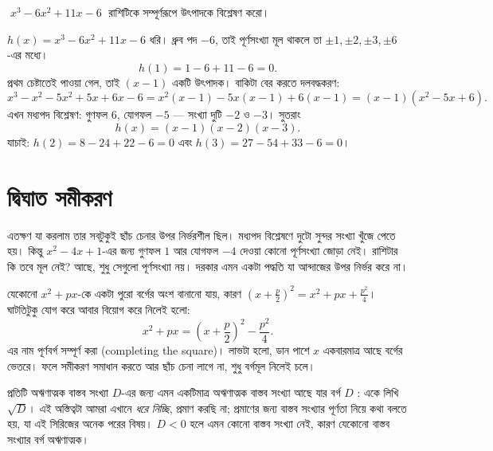 \documentclass[11pt]{article}
\begin{document}
 $\;x^{3} - 6x^{2} + 11x - 6\;$ রাশিটিকে সম্পূর্ণরূপে উৎপাদকে বিশ্লেষণ
করো।

\begin{sol}
$h(x) = x^{3} - 6x^{2} + 11x - 6$ ধরি। ধ্রুব পদ $-6$, তাই পূর্ণসংখ্যা মূল থাকলে
তা $\pm 1, \pm 2, \pm 3, \pm 6$-এর মধ্যে।
\[
  h(1) = 1 - 6 + 11 - 6 = 0 .
\]
প্রথম চেষ্টাতেই পাওয়া গেল, তাই $(x - 1)$ একটি উৎপাদক। বাকিটা বের করতে
দলবদ্ধকরণ:
\[
  x^{3} - x^{2} - 5x^{2} + 5x + 6x - 6
  = x^{2}(x-1) - 5x(x-1) + 6(x-1)
  = (x-1)(x^{2} - 5x + 6).
\]
এখন মধ্যপদ বিশ্লেষণ: গুণফল $6$, যোগফল $-5$ --- সংখ্যা দুটি $-2$ ও $-3$। সুতরাং
\[
  h(x) = (x - 1)(x - 2)(x - 3).
\]
যাচাই: $h(2) = 8 - 24 + 22 - 6 = 0$ এবং $h(3) = 27 - 54 + 33 - 6 = 0$।
\end{sol}

\section{দ্বিঘাত সমীকরণ}

\noindent
এতক্ষণ যা করলাম তার সবটুকুই ছাঁচ চেনার উপর নির্ভরশীল ছিল। মধ্যপদ বিশ্লেষণে
দুটো সুন্দর সংখ্যা খুঁজে পেতে হয়। কিন্তু $x^{2} - 4x + 1$-এর জন্য গুণফল $1$ আর
যোগফল $-4$ দেওয়া কোনো পূর্ণসংখ্যা জোড়া নেই। রাশিটার কি তবে মূল নেই? আছে, শুধু
সেগুলো পূর্ণসংখ্যা নয়। দরকার এমন একটা পদ্ধতি যা আন্দাজের উপর নির্ভর করে না।

\begin{idea}[পূর্ণবর্গ বানানো]
যেকোনো $x^{2} + px$-কে একটা পুরো বর্গের অংশ বানানো যায়, কারণ
$(x + \tfrac{p}{2})^{2} = x^{2} + px + \tfrac{p^{2}}{4}$। ঘাটতিটুকু যোগ করে
আবার বিয়োগ করে নিলেই হলো:
\[
  x^{2} + px = \left( x + \frac{p}{2} \right)^{2} - \frac{p^{2}}{4}.
\]
এর নাম পূর্ণবর্গ সম্পূর্ণ করা (completing the square)। লাভটা হলো, ডান পাশে
$x$ একবারমাত্র আছে বর্গের ভেতরে। ফলে সমীকরণ সমাধান করতে আর ছাঁচ চেনা লাগে
না, শুধু বর্গমূল নিলেই চলে।
\end{idea}

\begin{remark}[যা এখানে ধরে নেওয়া হচ্ছে]
প্রতিটি অঋণাত্মক বাস্তব সংখ্যা $D$-এর জন্য এমন একটিমাত্র অঋণাত্মক বাস্তব সংখ্যা
আছে যার বর্গ $D$ : একে লিখি $\sqrt{D}$। এই অস্তিত্বটা আমরা এখানে \emph{ধরে
নিচ্ছি}, প্রমাণ করছি না; প্রমাণের জন্য বাস্তব সংখ্যার পূর্ণতা নিয়ে কথা বলতে হয়,
যা এই সিরিজের অনেক পরের বিষয়। $D < 0$ হলে এমন কোনো বাস্তব সংখ্যা নেই, কারণ
যেকোনো বাস্তব সংখ্যার বর্গ অঋণাত্মক।
\end{remark}
\end{document}
